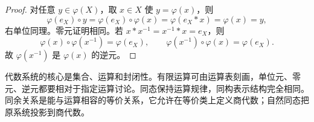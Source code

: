 \begin{proof}
  对任意 $y\in\varphi(X)$，取 $x\in X$ 使 $y=\varphi(x)$，则
  \[
  \varphi(e_X)\circ y=\varphi(e_X)\circ\varphi(x)=\varphi(e_X*x)=\varphi(x)=y,
  \]
  右单位同理。零元证明相同。若 $x*x^{-1}=x^{-1}*x=e_X$，则
  \[
  \varphi(x)\circ\varphi(x^{-1})=\varphi(e_X),
  \qquad
  \varphi(x^{-1})\circ\varphi(x)=\varphi(e_X).
  \]
  故 $\varphi(x^{-1})$ 是 $\varphi(x)$ 的逆元。
\end{proof}

\begin{summary}[本节提要]
  代数系统的核心是集合、运算和封闭性。有限运算可由运算表刻画，单位元、零元、逆元都要相对于指定运算讨论。同态保持运算规律，同构表示结构完全相同。同余关系是能与运算相容的等价关系，它允许在等价类上定义商代数；自然同态把原系统投影到商代数。
\end{summary}
